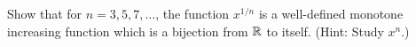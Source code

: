 \begin{exercise}
  \label{ex:hw03:odd-roots}
  Show that for $n=3,5,7,\ldots$, the function $x^{1/n}$ is a well-defined
  monotone increasing function which is a bijection from $\mathbb{R}$ to itself.
  (Hint: Study $x^n$.)
\end{exercise}
